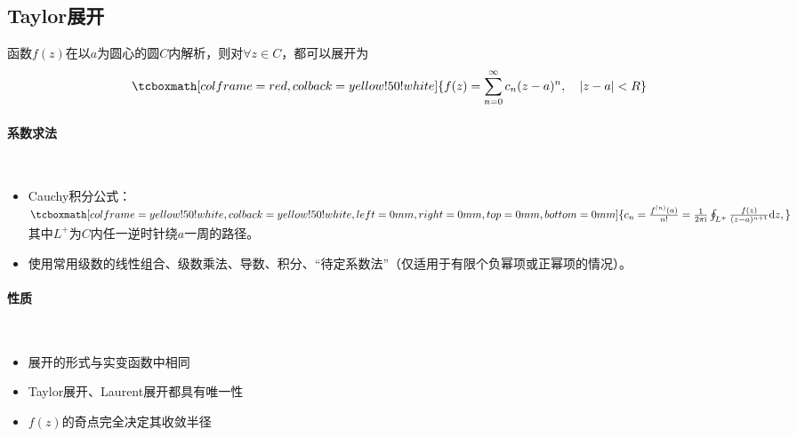 \documentclass[UTF8,12pt]{ctexart}
\newcommand\stressbox{\tcboxmath[colframe=red,colback=yellow!50!white]}
\newcommand\stress{\tcboxmath[colframe=yellow!50!white,colback=yellow!50!white,left=0mm,right=0mm,top=0mm,bottom=0mm]}
\newenvironment{itemizeg}{\begin{itemize}}{\end{itemize}}
\newenvironment{itemizeb}{\begin{itemize}}{\end{itemize}}
\newcommand{\I}{{\rm i}}
\begin{document}
\subsection{Taylor展开}
函数$f(z)$在以$a$为圆心的圆$C$内解析，则对$\forall z\in C$，都可以展开为
\begin{equation}
    \stressbox{f(z)=\sum_{n=0}^\infty c_n(z-a)^n,\quad |z-a|<R}
\end{equation}
\paragraph*{系数求法}\
\begin{itemizeb}
    \item Cauchy积分公式：$\stress{c_n=\frac{f^{(n)}(a)}{n!}=\frac{1}{2\pi\I}\oint_{L^+}\frac{f(z)}{(z-a)^{n+1}}{\rm d}z,}$其中$L^+$为$C$内任一逆时针绕$a$一周的路径。
    \item 使用常用级数的线性组合、级数乘法、导数、积分、“待定系数法”（仅适用于有限个负幂项或正幂项的情况）。
\end{itemizeb}

\paragraph*{性质}\
\begin{itemizeg}
    \item 展开的形式与实变函数中相同
    \item Taylor展开、Laurent展开都具有唯一性
    \item $f(z)$的奇点完全决定其收敛半径
\end{itemizeg}
\end{document}
